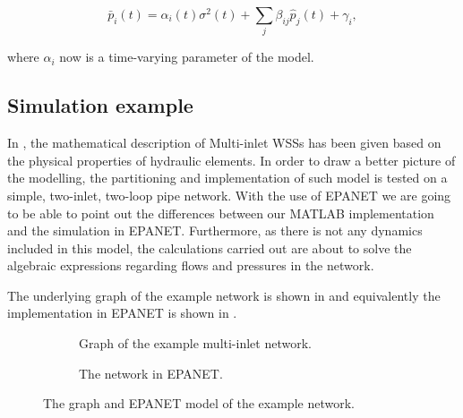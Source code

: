 \begin{equation}
\label{model_multiinlet2}
\bar{p}_i(t) = \alpha_i(t) \sigma^2(t) + \sum_j \beta_{ij} \hat{p}_j(t) + \gamma_i,
\end{equation}

where $\alpha_i$ now is a time-varying parameter of the model. 

\subsection{Simulation example}
\label{multi_inlet_network_example}

In , the mathematical description of Multi-inlet WSSs has been given based on the physical properties of hydraulic elements. In order to draw a better picture of the modelling, the partitioning and implementation of such model is tested on a simple, two-inlet, two-loop pipe network. With the use of EPANET we are going to be able to point out the differences between our MATLAB implementation and the simulation in EPANET. Furthermore, as there is not any dynamics included in this model, the calculations carried out are about to solve the algebraic expressions regarding flows and pressures in the network. 


The underlying graph of the example network is shown in  and equivalently the implementation in EPANET is shown in .

\begin{figure}[H]
\centering
\begin{subfigure}{.49\textwidth}
\centering
\hspace{3mm}
 
\vspace{2mm}
\caption{Graph of the example multi-inlet network.}
\label{fig:example1_graph}
\end{subfigure}
\begin{subfigure}{.49\textwidth}
\centering
\hspace{0mm}
 
\vspace{3mm}
  \caption{The network in EPANET.}
  \label{fig:example_EPANET}
\end{subfigure}
\caption{The graph and EPANET model of the example network.}
\label{fig:example_sum}
\end{figure}
\vspace{-3mm}

